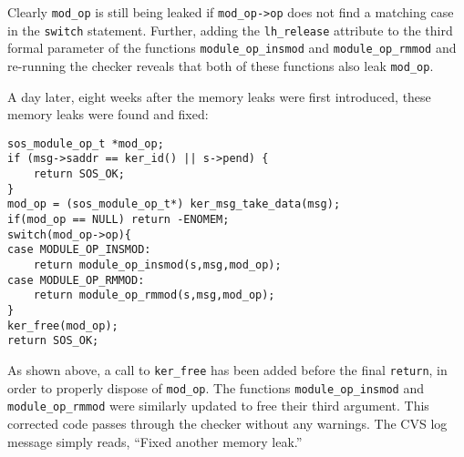 Clearly {\tt mod\_op} is still being leaked if {\tt mod\_op->op} does
not find a matching case in the {\tt switch} statement.  Further,
adding the {\tt lh\_release} attribute to the third formal parameter
of the functions {\tt module\_op\_insmod} and {\tt module\_op\_rmmod}
and re-running the checker reveals that both of these functions also
leak {\tt mod\_op}.

A day later, eight weeks after the memory leaks were first introduced,
these memory leaks were found and fixed:

\begin{scriptsize}
\begin{verbatim}
sos_module_op_t *mod_op;
if (msg->saddr == ker_id() || s->pend) {
    return SOS_OK;
}
mod_op = (sos_module_op_t*) ker_msg_take_data(msg);
if(mod_op == NULL) return -ENOMEM;
switch(mod_op->op){
case MODULE_OP_INSMOD:
    return module_op_insmod(s,msg,mod_op);
case MODULE_OP_RMMOD:
    return module_op_rmmod(s,msg,mod_op);
}
ker_free(mod_op);
return SOS_OK;
\end{verbatim}
\end{scriptsize}

As shown above, a call to {\tt ker\_free} has been added before the
final {\tt return}, in order to properly dispose of {\tt mod\_op}.
The functions {\tt module\_op\_insmod} and {\tt module\_op\_rmmod}
were similarly updated to free their third argument.  This corrected
code passes through the checker without any warnings.  The CVS log
message simply reads, ``Fixed another memory leak.''  



